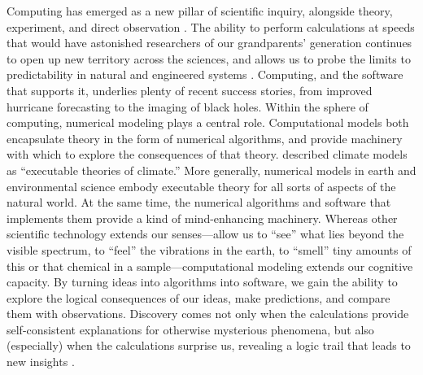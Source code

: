 \documentclass[12pt]{amsart}
\begin{document}
Computing has emerged as a new pillar of scientific inquiry, alongside theory, experiment, and direct observation  \citep{pitac2005computational}. The ability to perform calculations at speeds that would have astonished researchers of our grandparents' generation continues to open up new territory across the sciences, and allows us to probe the limits to predictability in natural and engineered systems \citep{post2005computational,post2013changing}. Computing, and the software that supports it, underlies plenty of recent success stories, from improved hurricane forecasting to the imaging of black holes. Within the sphere of computing, numerical modeling plays a central role. Computational models both encapsulate theory in the form of numerical algorithms, and provide machinery with which to explore the consequences of that theory. \citet{pipitone2012assessing} described climate models as ``executable theories of climate.'' More generally, numerical models in earth and environmental science embody executable theory for all sorts of aspects of the natural world. At the same time, the numerical algorithms and software that implements them provide a kind of mind-enhancing machinery. Whereas other scientific technology extends our senses---allow us to ``see'' what lies beyond the visible spectrum, to ``feel'' the vibrations in the earth, to ``smell'' tiny amounts of this or that chemical in a sample---computational modeling extends our cognitive capacity. By turning ideas into algorithms into software, we gain the ability to explore the logical consequences of our ideas, make predictions, and compare them with observations. Discovery comes not only when the calculations provide self-consistent explanations for otherwise mysterious phenomena, but also (especially) when the calculations surprise us, revealing a logic trail that leads to new insights \citep{bras2003six}.

\end{document}
